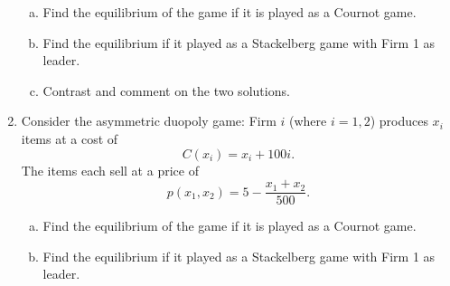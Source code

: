 \documentclass[a4paper,12pt]{article}
\begin{document}
\begin{enumerate}
        \begin{enumerate}[(a)]
        \item Find the equilibrium of the game if it is played as a Cournot game.
        \item Find the equilibrium if it played as a Stackelberg game with Firm 1 as
        leader. 
        \item Contrast and comment on the two solutions. 
        \end{enumerate}
        \medskip


\item Consider the asymmetric duopoly game: Firm $i$ (where $i = 1, 2$) produces $x_i$
        items
        at a cost of
        \[C(x_i) = x_i + 100i.\]
        The items each sell at a price of
        \[p(x_1, x_2) = 5 - \frac{x_1 + x_2}{500}.\]

        \begin{enumerate}[(a)]
        \item Find the equilibrium of the game if it is played as a Cournot game.
        \item Find the equilibrium if it played as a Stackelberg game with Firm 1 as
        leader. \end{enumerate}

\end{enumerate}
\end{document}
